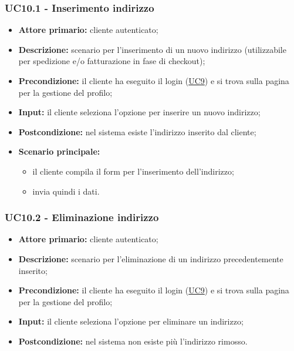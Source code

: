 \subsubsection{UC10.1 - Inserimento indirizzo}
\label{UC10.1}
\begin{itemize}
    \item \textbf{Attore primario:} cliente autenticato;
    \item \textbf{Descrizione:} scenario per l'inserimento di un nuovo indirizzo (utilizzabile per spedizione e/o fatturazione in fase di checkout);
    \item \textbf{Precondizione:} il cliente ha eseguito il login (\hyperref[UC9]{UC9}) e si trova sulla pagina per la gestione del profilo;
    \item \textbf{Input:} il cliente seleziona l'opzione per inserire un nuovo indirizzo;
    \item \textbf{Postcondizione:} nel sistema esiste l'indirizzo inserito dal cliente;
    \item \textbf{Scenario principale:}
    \begin{itemize}
        \item il cliente compila il form per l'inserimento dell'indirizzo;
        \item invia quindi i dati.
    \end{itemize}
\end{itemize}

\subsubsection{UC10.2 - Eliminazione indirizzo}
\label{UC10.2}
\begin{itemize}
    \item \textbf{Attore primario:} cliente autenticato;
    \item \textbf{Descrizione:} scenario per l'eliminazione di un indirizzo precedentemente inserito;
    \item \textbf{Precondizione:} il cliente ha eseguito il login (\hyperref[UC9]{UC9}) e si trova sulla pagina per la gestione del profilo;
    \item \textbf{Input:} il cliente seleziona l'opzione per eliminare un indirizzo;
    \item \textbf{Postcondizione:} nel sistema non esiste più l'indirizzo rimosso.
\end{itemize}

